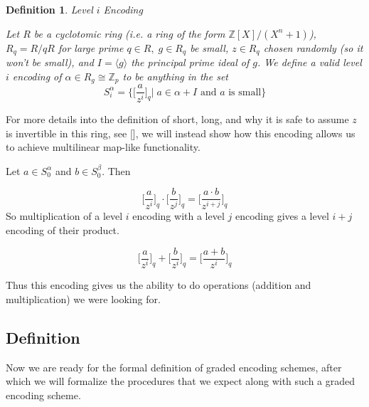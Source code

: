 \documentclass[12pt,twoside]{reedthesis}
\newtheorem{definition}{Definition}
\newcommand{\Z}[0]{\mathbb{Z}}
\begin{document}
    
    \begin{definition}{Level $i$ Encoding}
    \par Let $R$ be a cyclotomic ring (i.e. a ring of the form $\mathbb{Z}[X]/(X^n +1)$), $R_q = R/qR$ for large prime $q\in R,  \; g\in R_q$ be small, $z \in R_q$ chosen randomly (so it won't be small), and $I = \langle g\rangle$ the principal prime ideal of $g$. We define a valid level $i$ encoding of $\alpha \in R_g \cong \Z_p$ to be anything in the set
    $$S_i^\alpha =\bigg\{\bigg[\frac{a}{z^i} \bigg]_q \bigg| \; a \in \alpha + I \text{ and $a$ is small}\bigg\}$$
    \end{definition}
    For more details into the definition of short, long, and why it is safe to assume $z$ is invertible in this ring, see [\cite{GGH13}], we will instead show how this encoding allows us to achieve multilinear map-like functionality. 
    \par Let $a \in S_0^\alpha$ and $b \in S_0^\beta$. Then 
    
    \newcommand{\Encode}[2]{\bigg[ \frac{#2}{z^{#1}}\bigg]_q}
    $$
    \Encode{i}{a} \cdot \Encode{j}{b} = \Encode{i+j}{a \cdot b}
   $$
   So multiplication of a level $i$ encoding with a level $j$ encoding gives a level $i+j$ encoding of their product.
   
   
   $$\Encode{i}{a} + \Encode{i}{b} = \Encode{i}{a+b}$$
   
   Thus this encoding gives us the ability to do operations (addition and multiplication) we were looking for.
   \newcommand{\encode}[2]{\big[ \frac{#2}{z^{#1}}\big]_q}
   
   
   
   
   \subsection{Definition}
   
   \par Now we are ready for the formal definition of graded encoding schemes, after which we will formalize the procedures that we expect along with such a graded encoding scheme.
         
\end{document}
